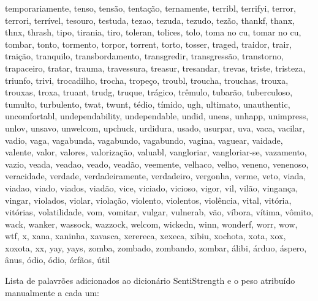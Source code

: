 temporariamente, tenso, tensão, tentação, ternamente, terribl, terrifyi, terror, terrori, terrível, tesouro, testuda, tezao, tezuda, tezudo, tezão, thankf, thanx, thnx, thrash, tipo, tirania, tiro, toleran, tolices, tolo, toma no cu, tomar no cu, tombar, tonto, tormento, torpor, torrent, torto, tosser, traged, traidor, trair, traição, tranquilo, transbordamento, transgredir, transgressão, transtorno, trapaceiro, tratar, trauma, travessura, treasur, tresandar, trevas, triste, tristeza, triunfo, trivi, trocadilho, trocha, tropeço, troubl, troucha, trouchas, trouxa, trouxas, troxa, truant, trudg, truque, trágico, trêmulo, tubarão, tuberculoso, tumulto, turbulento, twat, twunt, tédio, tímido, ugh, ultimato, unauthentic, uncomfortabl, undependability, undependable, undid, uneas, unhapp, unimpress, unlov, unsavo, unwelcom, upchuck, urdidura, usado, usurpar, uva, vaca, vacilar, vadio, vaga, vagabunda, vagabundo, vagabundo, vagina, vaguear, vaidade, valente, valor, valores, valorização, valuabl, vangloriar, vangloriar-se, vazamento, vazio, veada, veadao, veado, veadão, veemente, velhaco, velho, veneno, venenoso, veracidade, verdade, verdadeiramente, verdadeiro, vergonha, verme, veto, viada, viadao, viado, viados, viadão, vice, viciado, vicioso, vigor, vil, vilão, vingança, vingar, violados, violar, violação, violento, violentos, violência, vital, vitória, vitórias, volatilidade, vom, vomitar, vulgar, vulnerab, vão, víbora, vítima, vômito, wack, wanker, wassock, wazzock, welcom, wickedn, winn, wonderf, worr, wow, wtf, x, xana, xaninha, xavasca, xerereca, xexeca, xibiu, xochota, xota, xox, xoxota, xx, yay, yays, zomba, zombado, zombando, zombar, álibi, árduo, áspero, ânus, ódio, ódio, órfãos, útil 

\begin{comment}
\apendice{APÊNDICE B}
\addcontentsline{toc}{section}{APÊNDICE B}

Contém materiais de leitura opcional e complementar produzidos pelo autor da pesquisa, incluindo os instrumentos de coleta de dados a serem utilizados. Se não for utilizada, esta seção deve ser removida já na versão 1 do projeto.
\end{comment}

\newpage
{}

Lista de palavrões adicionados ao dicionário SentiStrength e o peso atribuído manualmente a cada um:

